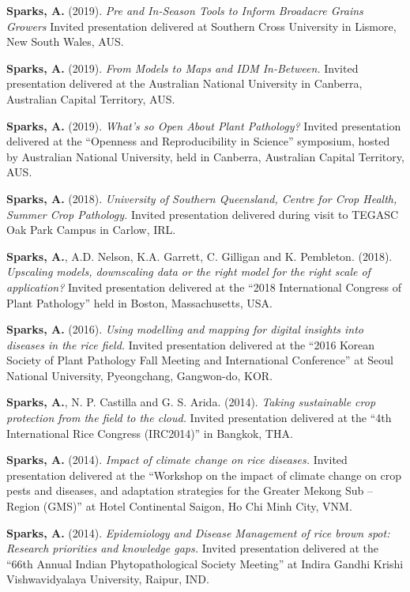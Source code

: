 \documentclass[11pt, a4paper]{awesome-cv}
\begin{document}
\textbf{Sparks, A.} (2019). \emph{Pre and In-Season Tools to Inform Broadacre Grains Growers} Invited presentation delivered at Southern Cross University in Lismore, New South Wales, AUS.

\textbf{Sparks, A.} (2019). \emph{From Models to Maps and IDM In-Between.} Invited presentation delivered at the Australian National University in Canberra, Australian Capital Territory, AUS.

\textbf{Sparks, A.} (2019). \emph{What's so Open About Plant Pathology?} Invited presentation delivered at the ``Openness and Reproducibility in Science'' symposium, hosted by Australian National University, held in Canberra, Australian Capital Territory, AUS.

\textbf{Sparks, A.} (2018). \emph{University of Southern Queensland, Centre for Crop Health, Summer Crop Pathology.} Invited presentation delivered during visit to TEGASC Oak Park Campus in Carlow, IRL.

\textbf{Sparks, A.}, A.D. Nelson, K.A. Garrett, C. Gilligan and K. Pembleton. (2018). \emph{Upscaling models, downscaling data or the right model for the right scale of application?} Invited presentation delivered at the ``2018 International Congress of Plant Pathology'' held in Boston, Massachusetts, USA.

\textbf{Sparks, A.} (2016). \emph{Using modelling and mapping for digital insights into diseases in the rice field.} Invited presentation delivered at the ``2016 Korean Society of Plant Pathology Fall Meeting and International Conference'' at Seoul National University, Pyeongchang, Gangwon-do, KOR.

\textbf{Sparks, A.}, N. P. Castilla and G. S. Arida. (2014). \emph{Taking sustainable crop protection from the field to the cloud.} Invited presentation delivered at the ``4th International Rice Congress (IRC2014)'' in Bangkok, THA.

\textbf{Sparks, A.} (2014). \emph{Impact of climate change on rice diseases.} Invited presentation delivered at the ``Workshop on the impact of climate change on crop pests and diseases, and adaptation strategies for the Greater Mekong Sub -- Region (GMS)'' at Hotel Continental Saigon, Ho Chi Minh City, VNM.

\textbf{Sparks, A.} (2014). \emph{Epidemiology and Disease Management of rice brown spot: Research priorities and knowledge gaps.} Invited presentation delivered at the ``66th Annual Indian Phytopathological Society Meeting'' at Indira Gandhi Krishi Vishwavidyalaya University, Raipur, IND.
\end{document}
